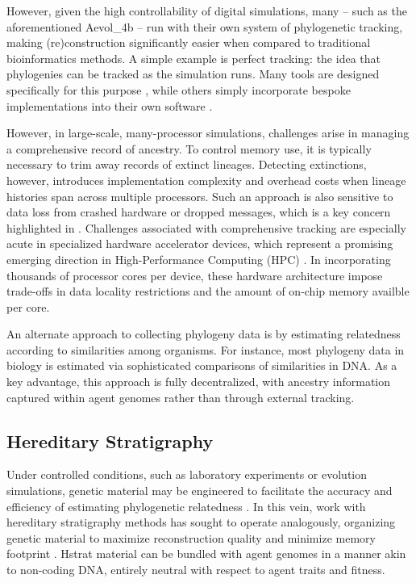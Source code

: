 However, given the high controllability of digital simulations, many -- such as the aforementioned Aevol\_4b -- run with their own system of phylogenetic tracking, making (re)construction significantly easier when compared to traditional bioinformatics methods.
A simple example is perfect tracking: the idea that phylogenies can be tracked as the simulation runs. Many tools are designed specifically for this purpose \citep{dolson2024phylotrack}, while others simply incorporate bespoke implementations into their own software \citep{ofria2004avida}.

However, in large-scale, many-processor simulations, challenges arise in managing a comprehensive record of ancestry.
To control memory use, it is typically necessary to trim away records of extinct lineages.
Detecting extinctions, however, introduces implementation complexity and overhead costs when lineage histories span across multiple processors.
Such an approach is also sensitive to data loss from crashed hardware or dropped messages, which is a key concern highlighted in \citep{ackley2016indefinite,ackley2014indefinitely}.
Challenges associated with comprehensive tracking are especially acute in specialized hardware accelerator devices, which represent a promising emerging direction in High-Performance Computing (HPC) \citep{emani2024democratizing}.
In incorporating thousands of processor cores per device, these hardware architecture impose trade-offs in data locality restrictions and the amount of on-chip memory availble per core.

An alternate approach to collecting phylogeny data is by estimating relatedness according to similarities among organisms.
For instance, most phylogeny data in biology is estimated via sophisticated comparisons of similarities in DNA.
As a key advantage, this approach is fully decentralized, with ancestry information captured within agent genomes rather than through external tracking.

\subsection{Hereditary Stratigraphy} \label{sec:introduction:hstrat}



Under controlled conditions, such as laboratory experiments or evolution simulations, genetic material may be engineered to facilitate the accuracy and efficiency of estimating phylogenetic relatedness \citep{li2024reconstructing}.
In this vein, work with hereditary stratigraphy methods has sought to operate analogously, organizing genetic material to maximize reconstruction quality and minimize memory footprint \citep{moreno2022hereditary}.
Hstrat material can be bundled with agent genomes in a manner akin to non-coding DNA, entirely neutral with respect to agent traits and fitness.

